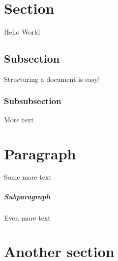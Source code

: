 \documentclass{article}
\begin{document}
	\section{Section}
	Hello World
	\subsection{Subsection}
	Structuring a document is easy!
	\subsubsection{Subsubsection}
	More text
	\section{Paragraph}
	Some more text
	\subparagraph{Subparagraph}
	Even more text
	\section{Another section}
\end{document}
